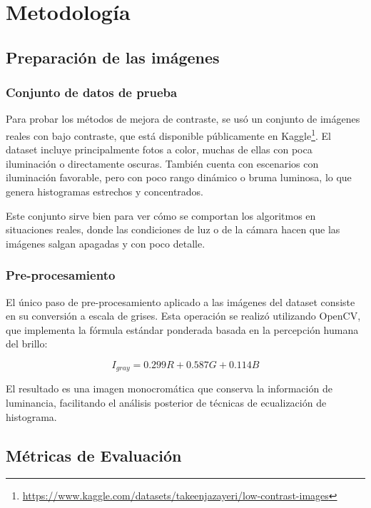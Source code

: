 \documentclass[sigchi]{acmart}
\begin{document}
\section{Metodología}
\label{sec:metodologia}

\subsection{Preparación de las imágenes}
\label{subsec:preparacion}

\subsubsection{Conjunto de datos de prueba}

Para probar los métodos de mejora de contraste, se usó un conjunto de imágenes reales con bajo
contraste, que está disponible públicamente en
Kaggle\footnote{\url{https://www.kaggle.com/datasets/takeenjazayeri/low-contrast-images}}. El
dataset incluye principalmente fotos a color, muchas de ellas con poca iluminación o
directamente oscuras. También cuenta con escenarios con iluminación favorable, pero con poco
rango dinámico o bruma luminosa, lo que genera histogramas estrechos y concentrados.

Este conjunto sirve bien para ver cómo se comportan los algoritmos en situaciones reales, donde
las condiciones de luz o de la cámara hacen que las imágenes salgan apagadas y con poco
detalle.

\subsubsection{Pre-procesamiento}

El único paso de pre-procesamiento aplicado a las imágenes del dataset consiste en su
conversión a escala de grises. Esta operación se realizó utilizando OpenCV, que implementa la
fórmula estándar ponderada basada en la percepción humana del brillo:

\begin{equation}
	I_{gray} = 0.299R + 0.587G + 0.114B
\end{equation}

El resultado es una imagen monocromática que conserva la información de luminancia, facilitando
el análisis posterior de técnicas de ecualización de histograma.

\subsection{Métricas de Evaluación}
\end{document}
